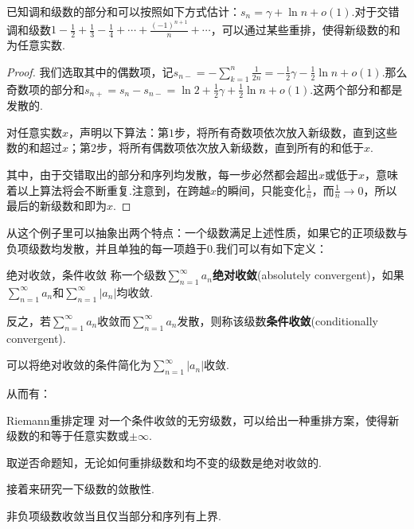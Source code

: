 \documentclass[lang=cn, zihao=5]{elegantbook}
\begin{document}
\begin{example}
	已知调和级数的部分和可以按照如下方式估计：$s_n=\gamma + \ln n + o(1)$.对于交错调和级数$1-\frac{1}{2}+\frac{1}{3}-\frac{1}{4}+\cdots + \frac{(-1)^{n+1}}{n}+\cdots $，可以通过某些重排，使得新级数的和为任意实数.
\end{example}
\begin{proof}
	我们选取其中的偶数项，记$s_{n-}=-\sum_{k=1}^{n} \frac{1}{2n} = -\frac{1}{2}\gamma -\frac{1}{2}\ln n+o(1)$.那么奇数项的部分和$s_{n+}=s_n-s_{n-}=\ln 2+\frac{1}{2}\gamma + \frac{1}{2}\ln n + o(1)$.这两个部分和都是发散的.
	
	对任意实数$x$，声明以下算法：第$1$步，将所有奇数项依次放入新级数，直到这些数的和超过$x$；第$2$步，将所有偶数项依次放入新级数，直到所有的和低于$x$.
	
	其中，由于交错取出的部分和序列均发散，每一步必然都会超出$x$或低于$x$，意味着以上算法将会不断重复.注意到，在跨越$x$的瞬间，只能变化$\frac{1}{n}$，而$\frac{1}{n} \to 0$，所以最后的新级数和即为$x$.
\end{proof}

从这个例子里可以抽象出两个特点：一个级数满足上述性质，如果它的正项级数与负项级数均发散，并且单独的每一项趋于$0$.我们可以有如下定义：

\begin{definition}{绝对收敛，条件收敛}
	称一个级数$\sum_{n=1}^{\infty} a_n$\textbf{绝对收敛}(absolutely convergent)，如果$\sum_{n=1}^{\infty} a_n$和$\sum_{n=1}^{\infty} |a_n|$均收敛.
	
	反之，若$\sum_{n=1}^{\infty} a_n$收敛而$\sum_{n=1}^{\infty} a_n$发散，则称该级数\textbf{条件收敛}(conditionally convergent).
\end{definition}
\begin{remark}
	可以将绝对收敛的条件简化为$\sum_{n=1}^{\infty} |a_n|$收敛.
\end{remark}

从而有：

\begin{theorem}{Riemann重排定理}
	对一个条件收敛的无穷级数，可以给出一种重排方案，使得新级数的和等于任意实数或$\pm \infty$.
\end{theorem}
\begin{remark}
	取逆否命题知，无论如何重排级数和均不变的级数是绝对收敛的.
\end{remark}

接着来研究一下级数的敛散性.

\begin{lemma}
	非负项级数收敛当且仅当部分和序列有上界.
\end{lemma}
\end{document}
